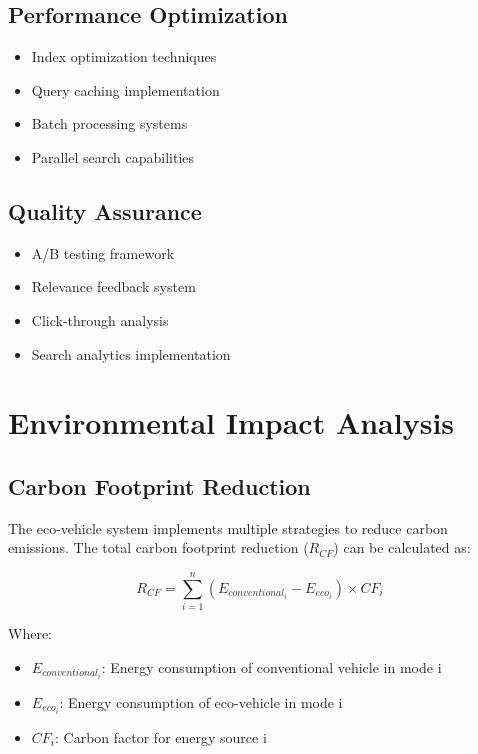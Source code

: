 \documentclass[12pt,a4paper]{article}
\begin{document}
\subsection{Performance Optimization}
\begin{itemize}
    \item Index optimization techniques
    \item Query caching implementation
    \item Batch processing systems
    \item Parallel search capabilities
\end{itemize}

\subsection{Quality Assurance}
\begin{itemize}
    \item A/B testing framework
    \item Relevance feedback system
    \item Click-through analysis
    \item Search analytics implementation
\end{itemize}

\section{Environmental Impact Analysis}
\subsection{Carbon Footprint Reduction}
The eco-vehicle system implements multiple strategies to reduce carbon emissions. The total carbon footprint reduction (\(R_{CF}\)) can be calculated as:

\begin{equation}
R_{CF} = \sum_{i=1}^{n} (E_{conventional_i} - E_{eco_i}) \times CF_i
\end{equation}

Where:
\begin{itemize}
    \item \(E_{conventional_i}\): Energy consumption of conventional vehicle in mode i
    \item \(E_{eco_i}\): Energy consumption of eco-vehicle in mode i
    \item \(CF_i\): Carbon factor for energy source i
\end{itemize}
\end{document}
